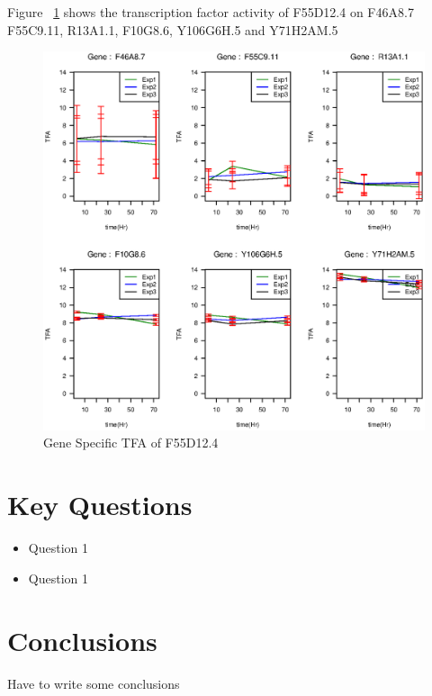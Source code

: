 \documentclass[12pt]{article}
\begin{document}
      
Figure ~\ref{fig:F55D12.4} shows the transcription factor activity of F55D12.4 on F46A8.7
F55C9.11, R13A1.1, F10G8.6, Y106G6H.5 and Y71H2AM.5

\begin{figure}[!htb]
  \includegraphics[width=1.0\linewidth]{picture/F55D12_4_3dp_HS_LC_tfid8.eps}
  \caption{Gene Specific TFA of F55D12.4}
  \label{fig:F55D12.4}
\end{figure}


\section{Key Questions}\label{conclusions}

\begin{itemize}
	\item Question 1
	\item Question 1
\end{itemize}	      
      
      

\section{Conclusions}\label{conclusions}

Have to write some conclusions


%
%



\end{document}
